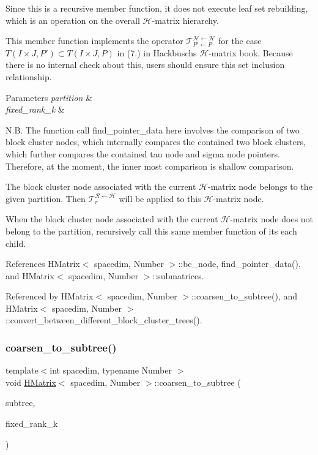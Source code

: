 Since this is a recursive member function, it does not execute leaf set rebuilding, which is an operation on the overall $\mathcal{H}$-\/matrix hierarchy.

This member function implements the operator $\mathcal{T}_{P' \leftarrow P}^{\mathcal{H} \leftarrow \mathcal{H}}$ for the case $T(I \times J, P') \subset T(I \times J, P)$ in (7.) in Hackbusch\textquotesingle{}s $\mathcal{H}$-\/matrix book. Because there is no internal check about this, users should ensure this set inclusion relationship.


\begin{DoxyParams}{Parameters}
{\em partition} & \\
\hline
{\em fixed\+\_\+rank\+\_\+k} & \\
\hline
\end{DoxyParams}
N.\+B. The function call {\ttfamily find\+\_\+pointer\+\_\+data} here involves the comparison of two block cluster nodes, which internally compares the contained two block clusters, which further compares the contained tau node and sigma node pointers. Therefore, at the moment, the inner most comparison is shallow comparison.

The block cluster node associated with the current $\mathcal{H}$-\/matrix node belongs to the given {\ttfamily partition}. Then $\mathcal{T}_r^{\mathcal{R} \leftarrow \mathcal{H}}$ will be applied to this $\mathcal{H}$-\/matrix node.

When the block cluster node associated with the current $\mathcal{H}$-\/matrix node does not belong to the {\ttfamily partition}, recursively call this same member function of its each child.

References H\+Matrix$<$ spacedim, Number $>$\+::bc\+\_\+node, find\+\_\+pointer\+\_\+data(), and H\+Matrix$<$ spacedim, Number $>$\+::submatrices.



Referenced by H\+Matrix$<$ spacedim, Number $>$\+::coarsen\+\_\+to\+\_\+subtree(), and H\+Matrix$<$ spacedim, Number $>$\+::convert\+\_\+between\+\_\+different\+\_\+block\+\_\+cluster\+\_\+trees().

\mbox{\label{classHMatrix_a27c7390b792e6e47ab2861616a997d99}} 
\subsubsection{\texorpdfstring{coarsen\+\_\+to\+\_\+subtree()}{coarsen\_to\_subtree()}}
{\footnotesize\ttfamily template$<$int spacedim, typename Number $>$ \\
void \hyperlink{classHMatrix}{H\+Matrix}$<$ spacedim, Number $>$\+::coarsen\+\_\+to\+\_\+subtree (\begin{DoxyParamCaption}\item[{const \hyperlink{classBlockClusterTree}{Block\+Cluster\+Tree}$<$ spacedim, Number $>$ \&}]{subtree,  }\item[{const unsigned int}]{fixed\+\_\+rank\+\_\+k }\end{DoxyParamCaption})}

